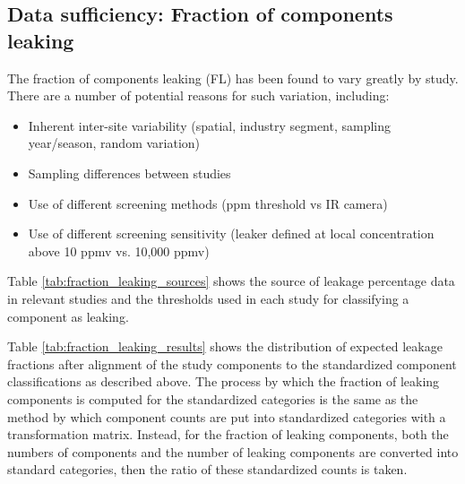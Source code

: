 \documentclass[11pt]{report}
\begin{document}
{{{{\subsection{Data sufficiency: Fraction of components leaking}

The fraction of components leaking (FL) has been found to vary greatly by study. There are a number of potential reasons for such variation, including:
\begin{itemize}
\item	Inherent inter-site variability (spatial, industry segment, sampling year/season, random variation)
\item Sampling differences between studies
\item Use of different screening methods (ppm threshold vs IR camera)
\item Use of different screening sensitivity (leaker defined at local concentration above 10 ppmv vs. 10,000 ppmv)
\end{itemize}

Table \ref{tab:fraction_leaking_sources} shows the source of leakage percentage data in relevant studies and the thresholds used in each study for classifying a component as leaking. 

Table \ref{tab:fraction_leaking_results} shows the distribution of expected leakage fractions after alignment of the study components to the standardized component classifications as described above.  The process by which the fraction of leaking components is computed for the standardized categories is the same as the method by which component counts are put into standardized categories with a transformation matrix. Instead, for the fraction of leaking components, both the numbers of components and the number of leaking components are converted into standard categories, then the ratio of these standardized counts is taken.


\begin{landscape}



\end{landscape}}}}}
\end{document}
